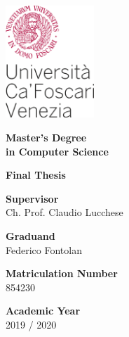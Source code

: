 \begin{titlepage}
	\includegraphics[width=0.25\textwidth]{0-resources/logo_ca_foscari.png}
   \begin{center}
       \vspace*{2cm}
       \textbf{Master’s Degree \\
       	in Computer Science}
 
       \vspace{2cm}
       \textbf{Final Thesis}
 
       \vspace{1cm}
		\textbf{\Large\thetitle}
   \end{center}

	\begin{adjustwidth}{0.7cm}{0cm}
		\vspace{3cm}
		\textbf{Supervisor}\\
		Ch. Prof. Claudio Lucchese
		
	
		\vspace{0.5cm}
		\noindent\textbf{Graduand}\\
		Federico Fontolan
		
		
		\vspace{0.5cm}
		\noindent\textbf{Matriculation Number}\\
		854230
		
		\vspace{0.5cm}
		\noindent\textbf{Academic Year}\\
		2019 / 2020
	\end{adjustwidth}
	
\end{titlepage}